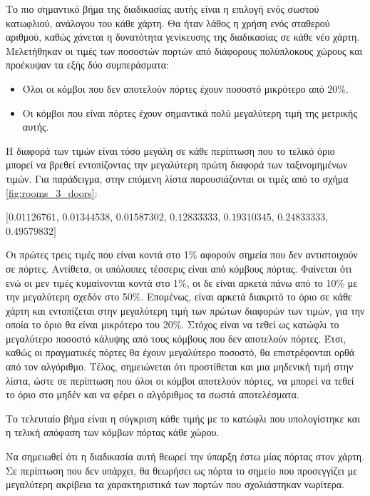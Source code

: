 Το πιο σημαντικό βήμα της διαδικασίας αυτής είναι η επιλογή ενός σωστού κατωφλιού, ανάλογου του κάθε χάρτη. Θα ήταν λάθος η χρήση ενός σταθερού αριθμού, καθώς χάνεται η δυνατότητα γενίκευσης της διαδικασίας σε κάθε νέο χάρτη. Μελετήθηκαν οι τιμές των ποσοστών πορτών από διάφορους πολύπλοκους χώρους και προέκυψαν τα εξής δύο συμπεράσματα:
\begin{itemize}
    \setlength\itemsep{-0.2em}
    \item Όλοι οι κόμβοι που δεν αποτελούν πόρτες έχουν ποσοστό μικρότερο από 20\%.
    \item Οι κόμβοι που είναι πόρτες έχουν σημαντικά πολύ μεγαλύτερη τιμή της μετρικής αυτής.
\end{itemize}
Η διαφορά των τιμών είναι τόσο μεγάλη σε κάθε περίπτωση που το τελικό όριο μπορεί να βρεθεί εντοπίζοντας την μεγαλύτερη πρώτη διαφορά των ταξινομημένων τιμών. Για παράδειγμα, στην επόμενη λίστα παρουσιάζονται οι τιμές από το σχήμα \ref{fig:rooms_3_doors}: 


$[0.01126761$, $0.01344538$, $0.01587302$, $0.12833333$, $0.19310345$, $0.24833333$, $0.49579832]$

\smallskip

Οι πρώτες τρεις τιμές που είναι κοντά στο 1\% αφορούν σημεία που δεν αντιστοιχούν σε πόρτες. Αντίθετα, οι υπόλοιπες τέσσερις είναι από κόμβους πόρτας. Φαίνεται ότι ενώ οι μεν τιμές κυμαίνονται κοντά στο 1\%, οι δε είναι αρκετά πάνω από το 10\% με την μεγαλύτερη σχεδόν στο 50\%. Επομένως, είναι αρκετά διακριτό το όριο σε κάθε χάρτη και εντοπίζεται στην μεγαλύτερη τιμή των πρώτων διαφορών των τιμών, για την οποία το όριο θα είναι μικρότερο του 20\%. Στόχος είναι να τεθεί ως κατώφλι το μεγαλύτερο ποσοστό κάλυψης από τους κόμβους που δεν αποτελούν πόρτες. Έτσι, καθώς οι πραγματικές πόρτες θα έχουν μεγαλύτερο ποσοστό, θα επιστρέφονται ορθά από τον αλγόριθμο. Τέλος, σημειώνεται ότι προστίθεται και μια μηδενική τιμή στην λίστα, ώστε σε περίπτωση που όλοι οι κόμβοι αποτελούν πόρτες, να μπορεί να τεθεί το όριο στο μηδέν και να φέρει ο αλγόριθμος τα σωστά αποτελέσματα.

Το τελευταίο βήμα είναι η σύγκριση κάθε τιμής με το κατώφλι που υπολογίστηκε και η τελική απόφαση των κόμβων πόρτας κάθε χώρου.

Να σημειωθεί ότι η διαδικασία αυτή θεωρεί την ύπαρξη έστω μίας πόρτας στον χάρτη. Σε περίπτωση που δεν υπάρχει, θα θεωρήσει ως πόρτα το σημείο που προσεγγίζει με μεγαλύτερη ακρίβεια τα χαρακτηριστικά των πορτών που σχολιάστηκαν νωρίτερα.



